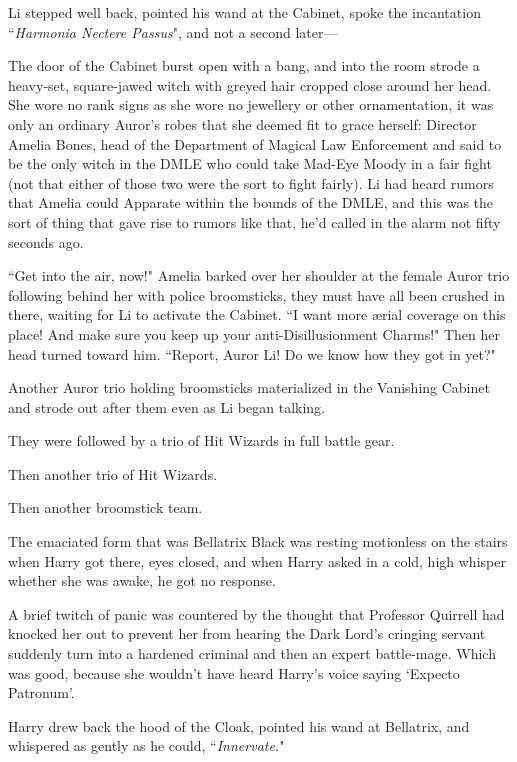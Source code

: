 Li stepped well back, pointed his wand at the Cabinet, spoke the incantation ``\emph{Harmonia Nectere Passus}", and not a second later—

The door of the Cabinet burst open with a bang, and into the room strode a heavy-set, square-jawed witch with greyed hair cropped close around her head. She wore no rank signs as she wore no jewellery or other ornamentation, it was only an ordinary Auror's robes that she deemed fit to grace herself: Director Amelia Bones, head of the Department of Magical Law Enforcement and said to be the only witch in the DMLE who could take Mad-Eye Moody in a fair fight (not that either of those two were the sort to fight fairly). Li had heard rumors that Amelia could Apparate within the bounds of the DMLE, and this was the sort of thing that gave rise to rumors like that, he'd called in the alarm not fifty seconds ago.

``Get into the air, now!" Amelia barked over her shoulder at the female Auror trio following behind her with police broomsticks, they must have all been crushed in there, waiting for Li to activate the Cabinet. ``I want more ærial coverage on this place! And make sure you keep up your anti-Disillusionment Charms!" Then her head turned toward him. ``Report, Auror Li! Do we know how they got in yet?"

Another Auror trio holding broomsticks materialized in the Vanishing Cabinet and strode out after them even as Li began talking.

They were followed by a trio of Hit Wizards in full battle gear.

Then another trio of Hit Wizards.

Then another broomstick team.

\later

The emaciated form that was Bellatrix Black was resting motionless on the stairs when Harry got there, eyes closed, and when Harry asked in a cold, high whisper whether she was awake, he got no response.

A brief twitch of panic was countered by the thought that Professor Quirrell had knocked her out to prevent her from hearing the Dark Lord's cringing servant suddenly turn into a hardened criminal and then an expert battle-mage. Which was good, because she wouldn't have heard Harry's voice saying `Expecto Patronum'.

Harry drew back the hood of the Cloak, pointed his wand at Bellatrix, and whispered as gently as he could, ``\emph{Innervate.}"

